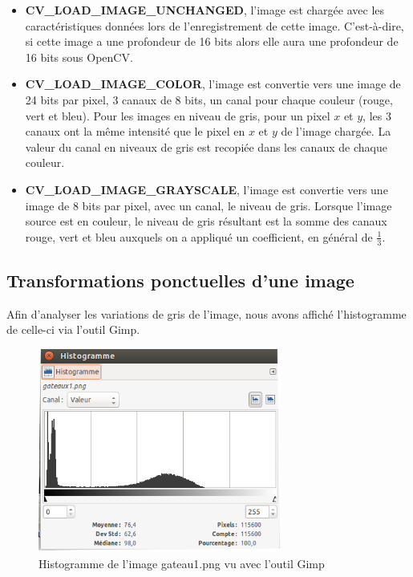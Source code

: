 \begin{itemize}
 \item \textbf{CV\_LOAD\_IMAGE\_UNCHANGED}, l'image est chargée avec les caractéristiques données lors 
de l'enregistrement de cette image. C'est-à-dire, si cette image a une profondeur de 16 bits alors 
elle aura une profondeur de 16 bits sous OpenCV.\\

 \item \textbf{CV\_LOAD\_IMAGE\_COLOR}, l'image est convertie vers une image de 24 bits par pixel, 3 canaux de 
8 bits, un canal pour chaque couleur (rouge, vert et bleu). Pour les images en niveau de gris, pour un pixel 
$x$ et $y$, les 3 canaux ont la même intensité que le pixel en $x$ et $y$ de l'image chargée. La valeur du canal en niveaux de gris est recopiée dans les canaux de chaque couleur.\\

 \item \textbf{CV\_LOAD\_IMAGE\_GRAYSCALE}, l'image est convertie vers une image de 8 bits par pixel, avec 
un canal, le niveau de gris. Lorsque l'image source est en couleur, le niveau de gris résultant est la 
somme des canaux rouge, vert et bleu auxquels on a appliqué un coefficient, en général de $\frac{1}{3}$.\\
\end{itemize}

\subsection{Transformations ponctuelles d'une image}

Afin d'analyser les variations de gris de l'image, nous avons affiché l'histogramme de celle-ci via 
l'outil Gimp.

\begin{figure}[H]
      \center
      \includegraphics[width=8cm]{ressources/tp3/histogramme1.png}
      \caption{Histogramme de l'image gateau1.png vu avec l'outil Gimp}
\end{figure}

